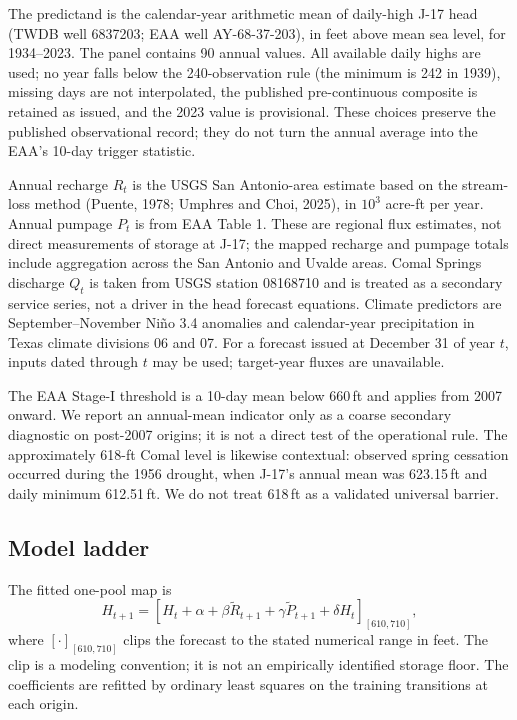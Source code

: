 \documentclass[11pt]{article}
\begin{document}
The predictand is the calendar-year arithmetic mean of daily-high J-17 head (TWDB well 6837203; EAA well AY-68-37-203), in feet above mean sea level, for 1934--2023. The panel contains 90 annual values. All available daily highs are used; no year falls below the 240-observation rule (the minimum is 242 in 1939), missing days are not interpolated, the published pre-continuous composite is retained as issued, and the 2023 value is provisional. These choices preserve the published observational record; they do not turn the annual average into the EAA's 10-day trigger statistic.

Annual recharge \(R_t\) is the USGS San Antonio-area estimate based on the stream-loss method (Puente, 1978; Umphres and Choi, 2025), in \(10^3\) acre-ft per year. Annual pumpage \(P_t\) is from EAA Table 1. These are regional flux estimates, not direct measurements of storage at J-17; the mapped recharge and pumpage totals include aggregation across the San Antonio and Uvalde areas. Comal Springs discharge \(Q_t\) is taken from USGS station 08168710 and is treated as a secondary service series, not a driver in the head forecast equations. Climate predictors are September--November Niño 3.4 anomalies and calendar-year precipitation in Texas climate divisions 06 and 07. For a forecast issued at December 31 of year \(t\), inputs dated through \(t\) may be used; target-year fluxes are unavailable.

The EAA Stage-I threshold is a 10-day mean below 660\,ft and applies from 2007 onward. We report an annual-mean indicator only as a coarse secondary diagnostic on post-2007 origins; it is not a direct test of the operational rule. The approximately 618-ft Comal level is likewise contextual: observed spring cessation occurred during the 1956 drought, when J-17's annual mean was 623.15\,ft and daily minimum 612.51\,ft. We do not treat 618\,ft as a validated universal barrier.

\subsection{Model ladder}

The fitted one-pool map is
\begin{equation}\label{eq:pool}
H_{t+1}=\left[H_t+\alpha+\beta\widetilde R_{t+1}+\gamma\widetilde P_{t+1}+\delta H_t\right]_{[610,710]},
\end{equation}
where \([\cdot]_{[610,710]}\) clips the forecast to the stated numerical range in feet. The clip is a modeling convention; it is not an empirically identified storage floor. The coefficients are refitted by ordinary least squares on the training transitions at each origin.
\end{document}

